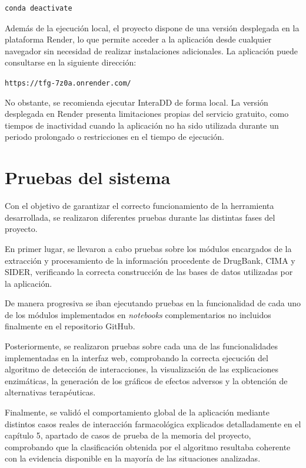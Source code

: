 \begin{verbatim}
conda deactivate
\end{verbatim}

Además de la ejecución local, el proyecto dispone de una versión desplegada en la plataforma Render, lo que permite acceder a la aplicación desde cualquier navegador sin necesidad de realizar instalaciones adicionales.
La aplicación puede consultarse en la siguiente dirección:
\begin{center}
\texttt{https://tfg-7z0a.onrender.com/}
\end{center}
No obstante, se recomienda ejecutar InteraDD de forma local. La versión desplegada en Render presenta limitaciones propias del servicio gratuito, como tiempos de inactividad cuando la aplicación no ha sido utilizada durante un periodo prolongado o restricciones en el tiempo de ejecución.

\section{Pruebas del sistema}

Con el objetivo de garantizar el correcto funcionamiento de la herramienta desarrollada, se realizaron diferentes pruebas durante las distintas fases del proyecto.

En primer lugar, se llevaron a cabo pruebas sobre los módulos encargados de la extracción y procesamiento de la información procedente de DrugBank, CIMA y SIDER, verificando la correcta construcción de las bases de datos utilizadas por la aplicación.

De manera progresiva se iban ejecutando pruebas en la funcionalidad de cada uno de los módulos implementados en \textit{notebooks} complementarios no incluidos finalmente en el repositorio GitHub.

Posteriormente, se realizaron pruebas sobre cada una de las funcionalidades implementadas en la interfaz web, comprobando la correcta ejecución del algoritmo de detección de interacciones, la visualización de las explicaciones enzimáticas, la generación de los gráficos de efectos adversos y la obtención de alternativas terapéuticas.

Finalmente, se validó el comportamiento global de la aplicación mediante distintos casos reales de interacción farmacológica explicados detalladamente en el capítulo 5, apartado de casos de prueba de la memoria del proyecto, comprobando que la clasificación obtenida por el algoritmo resultaba coherente con la evidencia disponible en la mayoría de las situaciones analizadas.

